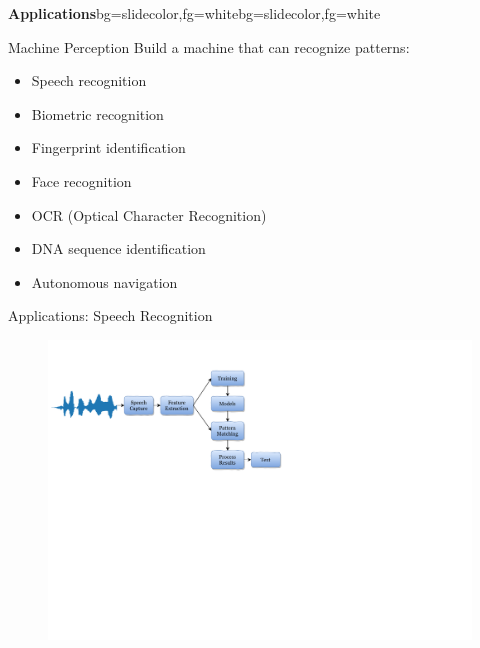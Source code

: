 \begin{frame}{}
\begin{variableblock}{\centering \Large \textbf{\vspace{4pt}\newline Applications\vspace{4pt}}}{bg=slidecolor,fg=white}{bg=slidecolor,fg=white}
\end{variableblock}
\end{frame}

\begin{frame}{Machine Perception}
Build a machine that can recognize patterns:
\begin{itemize}
\item Speech recognition
\item Biometric recognition
\item Fingerprint identification
\item Face recognition
\item OCR (Optical Character Recognition)
\item DNA sequence identification
\item Autonomous navigation
\end{itemize}
\end{frame}

\begin{frame}{Applications: Speech Recognition}
\begin{figure}
\includegraphics[scale=0.7]{Figures/speechProc}
\end{figure}
\end{frame}

